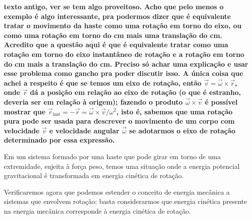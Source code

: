 \textbf{texto antigo, ver se tem algo proveitoso. Acho que pelo menos o exemplo é algo interessante, pra podermos dizer que é equivalente tratar o movimento da haste como uma rotação em torno do eixo, ou como uma rotação em torno do cm mais uma translação do cm. Acredito que a questão aqui é que é equivalente tratar como uma rotação em torno do eixo instantâneo de rotação e a rotação em torno do cm mais a translação do cm. Preciso só achar uma explicação e usar esse problema como gancho pra poder discutir isso. A única coisa que achei a respeito é que se temos um eixo de rotação, então $\vec{v} = \vec{\omega}\times\vec{r}$, onde $\vec{r}$ dá a posição em relação ao eixo de rotação (o que é estranho, deveria ser em relação à origem); fazendo o produto $\vec{\omega}\times\vec{v}$ é possível mostrar que $\vec{r}_{\text{inst}} = -\vec{r} = \vec{\omega}\times\vec{v} / \omega^2$, isto é, sabemos que uma rotação pura pode ser usada para descrever o movimento de um corpo com velocidade $\vec{v}$ e velocidade angular $\vec{\omega}$ se adotarmos o eixo de rotação determinado por essa expressão.} %
\begin{marginfigure}
\centering
{}
\caption{Em um sistema formado por uma haste que pode girar em torno de uma extremidade, sujeita à força peso, temos uma situação onde a energia potencial gravitacional é transformada em energia cinética de rotação. \label{Fig:EnergiaMecanicaNaRotacao}}
\end{marginfigure}

Verificaremos agora que podemos estender o conceito de energia mecânica a sistemas que envolvem rotação: basta considerarmos que energia cinética presente na energia mecânica corresponde à energia cinética de rotação.

